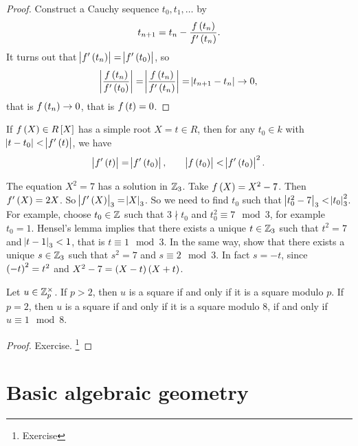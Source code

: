 \begin{proof}
Construct a Cauchy sequence $ t_0, t_1, \dots $ by
$$ t_{n + 1} = t_n - \dfrac{f\br{t_n}}{f'\br{t_n}}. $$
It turns out that $ \abs{f'\br{t_n}} = \abs{f'\br{t_0}} $, so
$$ \abs{\dfrac{f\br{t_n}}{f'\br{t_0}}} = \abs{\dfrac{f\br{t_n}}{f'\br{t_n}}} = \abs{t_{n + 1} - t_n} \to 0, $$
that is $ f\br{t_n} \to 0 $, that is $ f\br{t} = 0 $.
\end{proof}

\begin{lemma}
If $ f\br{X} \in R\sbr{X} $ has a simple root $ X = t \in R $, then for any $ t_0 \in k $ with $ \abs{t - t_0} < \abs{f'\br{t}} $, we have
$$ \abs{f'\br{t}} = \abs{f'\br{t_0}}, \qquad \abs{f\br{t_0}} < \abs{f'\br{t_0}}^2. $$
\end{lemma}

\begin{exercise}
The equation $ X^2 = 7 $ has a solution in $ \mathbb{Z}_3 $. Take $ f\br{X} = X^2 - 7 $. Then $ f'\br{X} = 2X $. So $ \abs{f'\br{X}}_3 = \abs{X}_3 $. So we need to find $ t_0 $ such that $ \abs{t_0^2 - 7}_3 < \abs{t_0}_3^2 $. For example, choose $ t_0 \in \mathbb{Z} $ such that $ 3 \nmid t_0 $ and $ t_0^2 \equiv 7 \mod 3 $, for example $ t_0 = 1 $. Hensel's lemma implies that there exists a unique $ t \in \mathbb{Z}_3 $ such that $ t^2 = 7 $ and $ \abs{t - 1}_3 < 1 $, that is $ t \equiv 1 \mod 3 $. In the same way, show that there exists a unique $ s \in \mathbb{Z}_3 $ such that $ s^2 = 7 $ and $ s \equiv 2 \mod 3 $. In fact $ s = -t $, since $ \br{-t}^2 = t^2 $ and $ X^2 - 7 = \br{X - t}\br{X + t} $.
\end{exercise}

\begin{corollary}
Let $ u \in \mathbb{Z}_p^\times $. If $ p > 2 $, then $ u $ is a square if and only if it is a square modulo $ p $. If $ p = 2 $, then $ u $ is a square if and only if it is a square modulo $ 8 $, if and only if $ u \equiv 1 \mod 8 $.
\end{corollary}

\begin{proof}
Exercise. \footnote{Exercise}
\end{proof}

\pagebreak

\section{Basic algebraic geometry}


